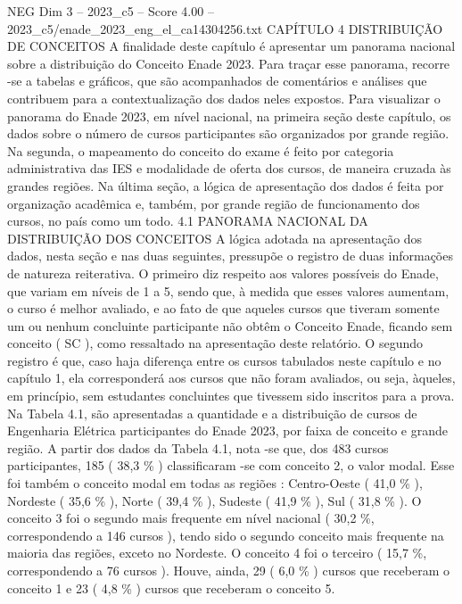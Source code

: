 \begin{textsample}{NEG Dim 3 – 2023\_c5 – Score 4.00 – 2023\_c5/enade\_2023\_eng\_el\_ca14304256.txt}  \label{ex:f3_neg_232}
CAPÍTULO 4 DISTRIBUIÇÃO DE CONCEITOS A finalidade deste capítulo é apresentar um panorama nacional sobre a distribuição do Conceito Enade 2023.
Para traçar esse panorama, recorre -se a tabelas e gráficos, que são acompanhados de comentários e análises que contribuem para a contextualização dos dados neles expostos.
Para visualizar o panorama do Enade 2023, em nível nacional, na primeira seção deste capítulo, os dados sobre o número de cursos participantes são organizados por grande região.
Na segunda, o mapeamento do conceito do exame é feito por categoria administrativa das IES e modalidade de oferta dos cursos, de maneira cruzada às grandes regiões.
Na última seção, a lógica de apresentação dos dados é feita por organização acadêmica e, também, por grande região de funcionamento dos cursos, no país como um todo. 4.1 PANORAMA NACIONAL DA DISTRIBUIÇÃO DOS CONCEITOS A lógica adotada na apresentação dos dados, nesta seção e nas duas seguintes, pressupõe o registro de duas informações de natureza reiterativa.
O primeiro diz respeito aos valores possíveis do Enade, que variam em níveis de 1 a 5, sendo que, à medida que esses valores aumentam, o curso é melhor avaliado, e ao fato de que aqueles cursos que tiveram somente um ou nenhum concluinte participante não obtêm o Conceito Enade, ficando sem conceito ( SC ), como ressaltado na apresentação deste relatório.
O segundo registro é que, caso haja diferença entre os cursos tabulados neste capítulo e no capítulo 1, ela corresponderá aos cursos que não foram avaliados, ou seja, àqueles, em princípio, sem estudantes concluintes que tivessem sido inscritos para a prova.
Na Tabela 4.1, são apresentadas a quantidade e a distribuição de cursos de Engenharia Elétrica participantes do Enade 2023, por faixa de conceito e grande região.
A partir dos dados da Tabela 4.1, nota -se que, dos 483 cursos participantes, 185 ( 38,3 \% ) classificaram -se com conceito 2, o valor modal.
Esse foi também o conceito modal em todas as regiões : Centro-Oeste ( 41,0 \% ), Nordeste ( 35,6 \% ), Norte ( 39,4 \% ), Sudeste ( 41,9 \% ), Sul ( 31,8 \% ).
O conceito 3 foi o segundo mais frequente em nível nacional ( 30,2 \%, correspondendo a 146 cursos ), tendo sido o segundo conceito mais frequente na maioria das regiões, exceto no Nordeste.
O conceito 4 foi o terceiro ( 15,7 \%, correspondendo a 76 cursos ).
Houve, ainda, 29 ( 6,0 \% ) cursos que receberam o conceito 1 e 23 ( 4,8 \% ) cursos que receberam o conceito 5.

\end{textsample}

